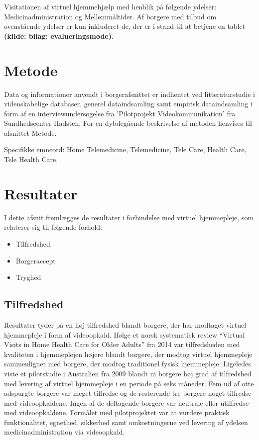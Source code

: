 Visitationen af virtuel hjemmehjælp med henblik på følgende ydelser: Medicinadministration og Mellemmåltider. Af borgere med tilbud om ovenstående ydelser er kun inkluderet de, der er i stand til at betjene en tablet \textbf{(kilde: bilag: evalueringsmøde)}.

\section{Metode}
Data og informationer anvendt i borgerafsnittet er indhentet ved litteraturstudie i videnskabelige databaser, generel dataindsamling samt empirisk dataindsamling i form af en interviewundersøgelse fra ’Pilotprojekt Videokommunikation’ fra Sundhedscenter Hadsten. For en dybdegående beskrivelse af metoden henvises til afsnittet Metode.

Specifikke emneord: Home Telemedicine, Telemedicine, Tele Care, Health Care, Tele Health Care.

\section{Resultater}
I dette afsnit fremlægges de resultater i forbindelse med virtuel hjemmepleje, som relaterer sig til følgende forhold:
\begin{itemize}
	\item Tilfredshed
	\item Borgeraccept 
	\item Tryghed
\end{itemize}

\subsection{Tilfredshed}
Resultater tyder på en høj tilfredshed blandt borgere, der har modtaget virtuel hjemmepleje i form af videoopkald. Ifølge et norsk systematisk review “Virtual Visits in Home Health Care for Older Adults” fra 2014 var tilfredsheden med kvaliteten i hjemmeplejen højere blandt borgere, der modtog virtuel hjemmepleje sammenlignet med borgere, der modtog traditionel fysisk hjemmepleje\cite{Baf2}. Ligeledes viste et pilotstudie i Australien fra 2009 blandt ni borgere høj grad af tilfredshed med levering af virtuel hjemmepleje i en periode på seks måneder. Fem ud af otte adspurgte borgere var meget tilfredse og de resterende tre borgere noget tilfredse med videoopkaldene. Ingen af de deltagende borgere var neutrale eller utilfredse med videoopkaldene. Formålet med pilotprojektet var at vurdere praktisk funktionalitet, egnethed, sikkerhed samt omkostningerne ved levering af ydelsen medicinadministration via videoopkald\cite{wade}. 

